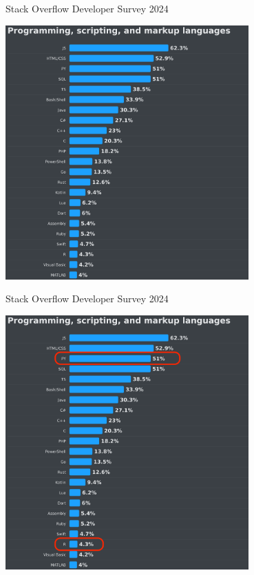 \documentclass[11pt]{beamer}
\begin{document}
\begin{frame}[c]{Stack Overflow Developer Survey 2024}
		\centering

\includegraphics[width=0.7\textwidth]{stackoverflow2024_0.png}
\end{frame}

\begin{frame}[c]{Stack Overflow Developer Survey 2024}
	\centering

	\includegraphics[width=0.7\textwidth]{stackoverflow2024_1.png}
\end{frame}
\end{document}

